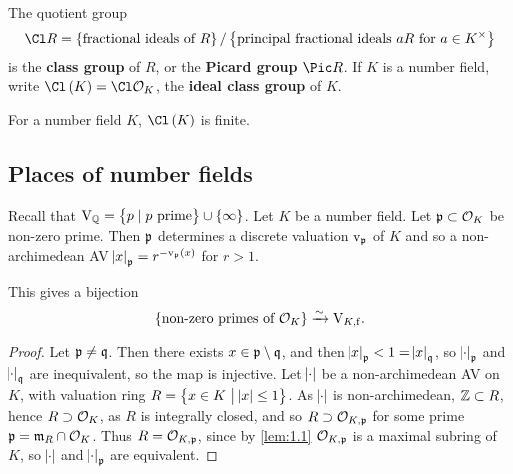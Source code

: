 The quotient group
$$ \Cl R = \cbr{\text{fractional ideals of} \ R} / \cbr{\text{principal fractional ideals} \ aR \ \text{for} \ a \in K^\times} $$
is the \textbf{class group} of $ R $, or the \textbf{Picard group} $ \Pic R $. If $ K $ is a number field, write $ \Cl\br{K} = \Cl \OOO_K $, the \textbf{ideal class group} of $ K $.

\begin{fact*}
For a number field $ K $, $ \Cl\br{K} $ is finite.
\end{fact*}

\pagebreak

\subsection{Places of number fields}

Recall that $ \V_\QQ = \cbr{p \mid p \ \text{prime}} \cup \cbr{\infty} $. Let $ K $ be a number field. Let $ \mathfrak{p} \subset \mathcal{O}_K $ be non-zero prime. Then $ \mathfrak{p} $ determines a discrete valuation $ \mathrm{v}_{\mathfrak{p}} $ of $ K $ and so a non-archimedean AV $ \abs{x}_\ppp = r^{-\v_\ppp\br{x}} $ for $ r > 1 $.

\begin{theorem}
This gives a bijection
$$ \cbr{\text{non-zero primes of} \ \OOO_K} \xrightarrow{\sim} \V_{K, \f}. $$
\end{theorem}

\begin{proof}
Let $ \mathfrak{p} \ne \mathfrak{q} $. Then there exists $ x \in \mathfrak{p} \setminus \mathfrak{q} $, and then $ \abs{x}_{\mathfrak{p}} < 1 = \abs{x}_{\mathfrak{q}} $, so $ \abs{\cdot}_{\mathfrak{p}} $ and $ \abs{\cdot}_{\mathfrak{q}} $ are inequivalent, so the map is injective. Let $ \abs{\cdot} $ be a non-archimedean AV on $ K $, with valuation ring $ R = \cbr{x \in K \st \abs{x} \le 1} $. As $ \abs{\cdot} $ is non-archimedean, $ \mathbb{Z} \subset R $, hence $ R \supset \mathcal{O}_K $, as $ R $ is integrally closed, and so $ R \supset \mathcal{O}_{K, \mathfrak{p}} $ for some prime $ \mathfrak{p} = \mathfrak{m}_R \cap \mathcal{O}_K $. Thus $ R = \mathcal{O}_{K, \mathfrak{p}} $, since by \ref{lem:1.1} $ \mathcal{O}_{K, \mathfrak{p}} $ is a maximal subring of $ K $, so $ \abs{\cdot} $ and $ \abs{\cdot}_{\mathfrak{p}} $ are equivalent.
\end{proof}

